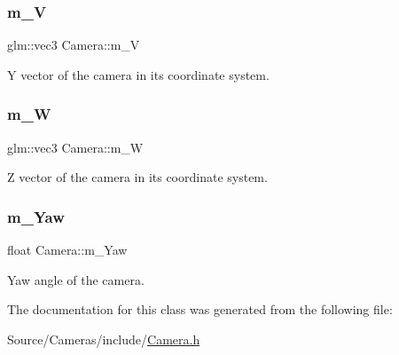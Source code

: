 \subsubsection{\texorpdfstring{m\+\_\+V}{m\_V}}
{\footnotesize\ttfamily glm\+::vec3 Camera\+::m\+\_\+V\hspace{0.3cm}{\ttfamily [protected]}}

Y vector of the camera in its coordinate system. \hypertarget{class_camera_a75de71e6e4b12d69d46d84d04f37c7c3}{}\label{class_camera_a75de71e6e4b12d69d46d84d04f37c7c3} 
\subsubsection{\texorpdfstring{m\+\_\+W}{m\_W}}
{\footnotesize\ttfamily glm\+::vec3 Camera\+::m\+\_\+W\hspace{0.3cm}{\ttfamily [protected]}}

Z vector of the camera in its coordinate system. \hypertarget{class_camera_ac3b7d101ef808536cac0f679deef5f9c}{}\label{class_camera_ac3b7d101ef808536cac0f679deef5f9c} 
\subsubsection{\texorpdfstring{m\+\_\+\+Yaw}{m\_Yaw}}
{\footnotesize\ttfamily float Camera\+::m\+\_\+\+Yaw\hspace{0.3cm}{\ttfamily [protected]}}

Yaw angle of the camera. 

The documentation for this class was generated from the following file\+:\begin{DoxyCompactItemize}
\item 
Source/\+Cameras/include/\hyperlink{_camera_8h}{Camera.\+h}\end{DoxyCompactItemize}
